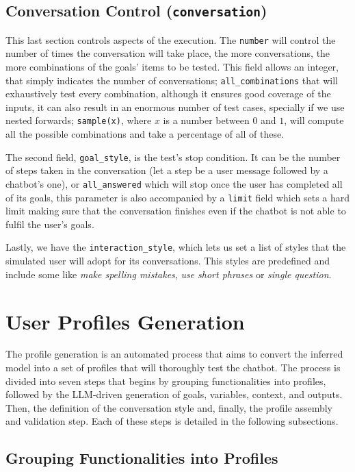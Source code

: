\subsection{Conversation Control (\texttt{conversation})}

This last section controls aspects of the execution.
The \texttt{number} will control the number of times the conversation will take place,
the more conversations, the more combinations of the goals' items to be tested.
This field allows an integer, that simply indicates the number of conversations;
\texttt{all\_combinations} that will exhaustively test every combination,
although it ensures good coverage of the inputs,
it can also result in an enormous number of test cases, specially if we use nested forwards;
\texttt{sample(x)}, where $x$ is a number between $0$ and $1$,
will compute all the possible combinations
and take a percentage of all of these.

The second field, \texttt{goal\_style}, is the test's stop condition.
It can be the number of steps taken in the conversation
(let a step be a user message followed by a chatbot's one),
or \texttt{all\_answered} which will stop once the user has completed all of its goals,
this parameter is also accompanied by a \texttt{limit} field which sets a hard limit
making sure that the conversation finishes even if the chatbot is not able to fulfil the user's goals.

Lastly, we have the \texttt{interaction\_style},
which lets us set a list of styles that the simulated user will adopt for its conversations.
This styles are predefined and include some like \textit{make spelling mistakes}, \textit{use short phrases}
or \textit{single question}.

\section{User Profiles Generation}\label{sec:profile-generation}

The profile generation is an automated process
that aims to convert the inferred model
into a set of profiles that will thoroughly test the chatbot.
The process is divided into seven steps that begins by
grouping functionalities into profiles,
followed by the \ac{LLM}-driven generation of goals, variables, context, and outputs.
Then, the definition of the conversation style and,
finally, the profile assembly and validation step.
Each of these steps is detailed in the following subsections.

\subsection{Grouping Functionalities into Profiles}

